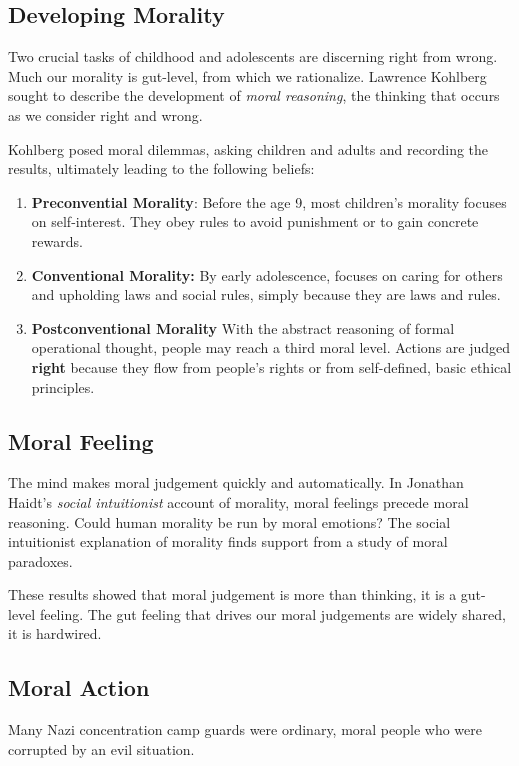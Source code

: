 \documentclass[12pt]{article}
\begin{document}
\subsection*{Developing Morality}
Two crucial tasks of childhood and adolescents are discerning right from wrong. Much our morality is gut-level, from which we rationalize. Lawrence Kohlberg sought to describe the development of \textit{moral reasoning}, the thinking that occurs as we consider right and wrong.

Kohlberg posed moral dilemmas, asking children and adults and recording the results, ultimately leading to the following beliefs:

\begin{enumerate}
\item \textbf{Preconvential Morality}: Before the age 9, most children's morality focuses on self-interest. They obey rules to avoid punishment or to gain concrete rewards.
\item \textbf{Conventional Morality:} By early adolescence, focuses on caring for others and upholding laws and social rules, simply because they are laws and rules.

\item {\bf Postconventional Morality} With the abstract reasoning of formal operational thought, people may reach a third moral level. Actions are judged \textbf{right} because they flow from people's rights or from self-defined, basic ethical principles. 

\end{enumerate}

\subsection*{Moral Feeling}
The mind makes moral judgement quickly and automatically. In Jonathan Haidt's \textit{social intuitionist} account of morality, moral feelings precede moral reasoning. Could human morality be run by moral emotions? The social intuitionist explanation of morality finds support from a study of moral paradoxes.

These results showed that moral judgement is more than thinking, it is a gut-level feeling. The gut feeling that drives our moral judgements are widely shared, it is hardwired. 

\subsection*{Moral Action}
Many Nazi concentration camp guards were ordinary, moral people who were corrupted by an evil situation.
\end{document}
